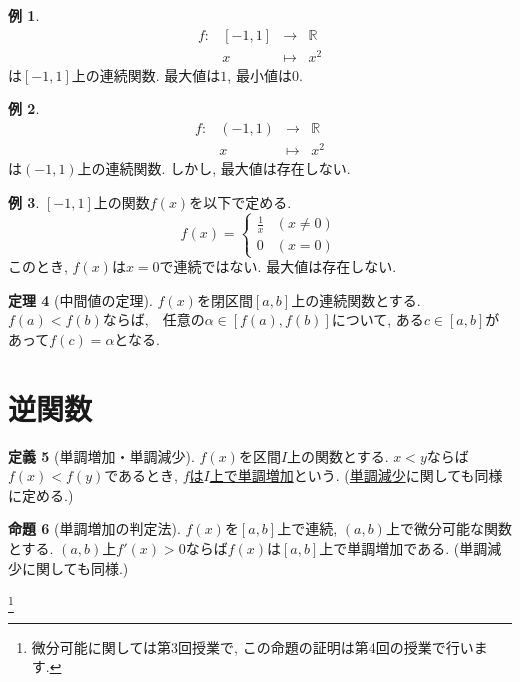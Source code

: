 \documentclass[dvipdfmx,a4paper,11pt]{article}
\newcommand{\R}{\mathbb{R}}
\theoremstyle{definition}
\newtheorem{thm}{定理}
\newtheorem{prop}[thm]{命題}
\newtheorem{dfn}[thm]{定義}
\newtheorem{exa}[thm]{例}
\begin{document}
 \begin{exa}
     $$
\begin{array}{cccc}
f: &[-1,1]& \rightarrow & \R  \\
&x& \longmapsto & x^2
\end{array}
$$
は$[-1,1]$上の連続関数. 
最大値は$1$, 最小値は$0$.
\end{exa}
 \begin{exa}
     $$
\begin{array}{cccc}
f: &(-1,1)& \rightarrow & \R  \\
&x& \longmapsto & x^2
\end{array}
$$
は$(-1,1)$上の連続関数. 
しかし, 最大値は存在しない.
\end{exa}

   \begin{exa}
   $[-1,1]$上の関数$f(x)$を以下で定める.
   $$
  f(x)= \begin{cases}
    \frac{1}{x}& (x \neq 0) \\
    0& (x= 0)
  \end{cases}
  $$
  このとき, $f(x)$は$x=0$で連続ではない.
  最大値は存在しない.
   \end{exa}
 
    \begin{tcolorbox}[
    colback = white,
    colframe = green!35!black,
    fonttitle = \bfseries,
    breakable = true]
    \begin{thm}[中間値の定理]
$f(x)$を閉区間$[a,b]$上の連続関数とする.
$f(a) < f(b)$ならば,　任意の$\alpha \in [f(a), f(b)]$について, ある$c \in [a,b]$があって$f(c) = \alpha$となる.
 \end{thm}
   \end{tcolorbox}
   
 \section{逆関数}
 
 
   \begin{tcolorbox}[
    colback = white,
    colframe = green!35!black,
    fonttitle = \bfseries,
    breakable = true]
    \begin{dfn}[単調増加・単調減少]
$f(x)$を区間$I$上の関数とする.
$x<y$ならば$f(x)<f(y)$であるとき, \underline{$f$は$I$上で単調増加}という.
(\underline{単調減少}に関しても同様に定める.)
\end{dfn}

  \end{tcolorbox}
  
      \begin{tcolorbox}[
    colback = white,
    colframe = green!35!black,
    fonttitle = \bfseries,
    breakable = true]
    \begin{prop}[単調増加の判定法]
$f(x)$を$[a,b]$上で連続, $(a,b)$上で微分可能な関数とする.
$(a,b)$上$f'(x)>0$ならば$f(x)$は$[a,b]$上で単調増加である.
(単調減少に関しても同様.)
 \end{prop}
   \end{tcolorbox}
   \footnote{微分可能に関しては第3回授業で, この命題の証明は第4回の授業で行います.}
   
\end{document}
